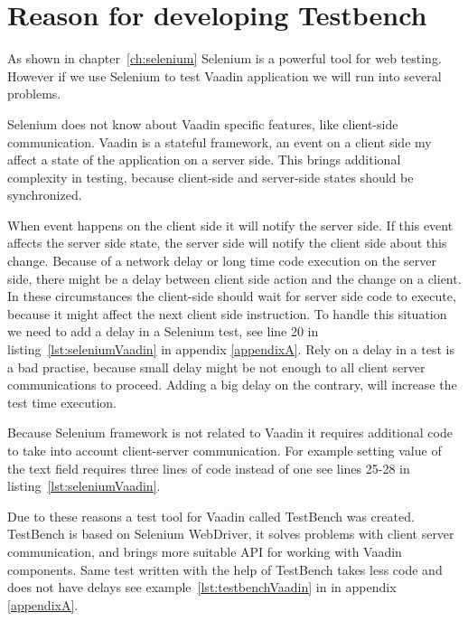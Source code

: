 \chapter{Reason for developing Testbench}
\label{ch:reasontestbenchdevelopment}
As shown in chapter~\ref{ch:selenium} Selenium is a powerful tool for web
testing.
However if we use Selenium to test Vaadin application we will run into several problems.

Selenium does not know about Vaadin specific features, like client-side	communication. 
Vaadin is a stateful framework, an event on a client side my affect a state of
the application on a server side. This brings additional complexity in testing,
because client-side and server-side states should be synchronized.

When event happens on the client side it will notify the server side.
If this event affects the server side state, the
server side will notify the client side about this change.
 Because of a network delay or long time code execution on the server side,
 there might be a delay between client side action and the change on a client. 
 In these circumstances the client-side should wait for server side code to execute,
  because it might affect the next client side instruction. To handle this
  situation we need to add a delay in a Selenium test, see line 20
   in listing~\ref{lst:seleniumVaadin} in appendix \ref{appendixA}. Rely on a
   delay in a test is a bad practise, because small delay might be not enough to all client server
   communications to proceed. Adding a big delay on the contrary, will increase
   the test time execution. 
   
 Because Selenium framework is not related to Vaadin it requires additional
   code to take into account client-server communication. For example setting
   value of the text field requires three lines of code instead of one see lines
   25-28 in listing~\ref{lst:seleniumVaadin}.
   
   Due to these reasons a test tool for Vaadin called TestBench was
   created. TestBench is based on Selenium WebDriver, it solves
   problems with client server communication, and brings more suitable
   API for working with Vaadin components. Same test written with 
   the help of TestBench takes less code and does not have delays see
   example~\ref{lst:testbenchVaadin} in in appendix \ref{appendixA}.
  	